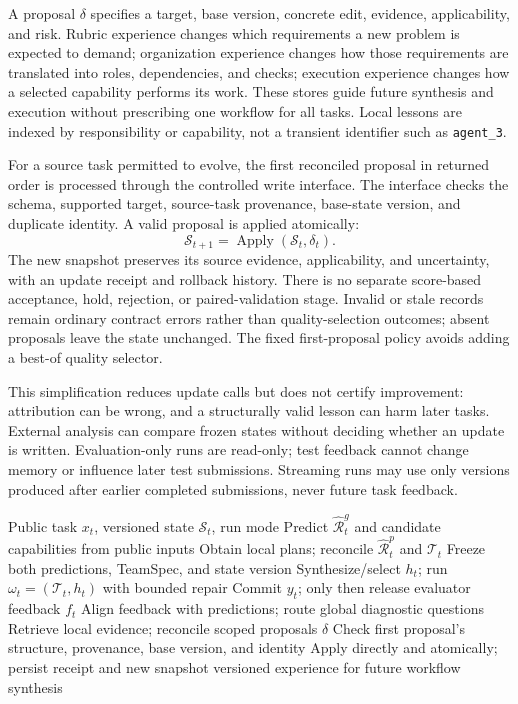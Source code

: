 \documentclass[11pt]{article}
\newcommand{\state}{\mathcal{S}}
\newcommand{\rub}{\widehat{\mathcal{R}}}
\newcommand{\team}{\mathcal{T}}
\begin{document}
A proposal $\delta$ specifies a target, base version, concrete edit, evidence, applicability, and risk. Rubric experience changes which requirements a new problem is expected to demand; organization experience changes how those requirements are translated into roles, dependencies, and checks; execution experience changes how a selected capability performs its work. These stores guide future synthesis and execution without prescribing one workflow for all tasks. Local lessons are indexed by responsibility or capability, not a transient identifier such as \texttt{agent\_3}.

For a source task permitted to evolve, the first reconciled proposal in returned order is processed through the controlled write interface. The interface checks the schema, supported target, source-task provenance, base-state version, and duplicate identity. A valid proposal is applied atomically:
\begin{equation}
\state_{t+1}=\operatorname{Apply}(\state_t,\delta_t).
\label{eq:update}
\end{equation}
The new snapshot preserves its source evidence, applicability, and uncertainty, with an update receipt and rollback history. There is no separate score-based acceptance, hold, rejection, or paired-validation stage. Invalid or stale records remain ordinary contract errors rather than quality-selection outcomes; absent proposals leave the state unchanged. The fixed first-proposal policy avoids adding a best-of quality selector.

This simplification reduces update calls but does not certify improvement: attribution can be wrong, and a structurally valid lesson can harm later tasks. External analysis can compare frozen states without deciding whether an update is written. Evaluation-only runs are read-only; test feedback cannot change memory or influence later test submissions. Streaming runs may use only versions produced after earlier completed submissions, never future task feedback.

\begin{algorithm}[t]
\caption{JIT-Compose: synthesize, execute, and retain}
\label{alg:cycle}
\small
\begin{algorithmic}[1]
\Require Public task $x_t$, versioned state $\state_t$, run mode
\State Predict $\rub_t^g$ and candidate capabilities from public inputs
\State Obtain local plans; reconcile $\rub_t^p$ and $\team_t$
\State Freeze both predictions, TeamSpec, and state version
\State Synthesize/select $h_t$; run $\omega_t=(\team_t,h_t)$ with bounded repair
\State Commit $y_t$; only then release evaluator feedback $f_t$
\State Align feedback with predictions; route global diagnostic questions
\State Retrieve local evidence; reconcile scoped proposals $\delta$
\State Check first proposal's structure, provenance, base version, and identity
\State Apply directly and atomically; persist receipt and new snapshot
\EndIf
\State \Return versioned experience for future workflow synthesis
\end{algorithmic}
\end{algorithm}
\end{document}

